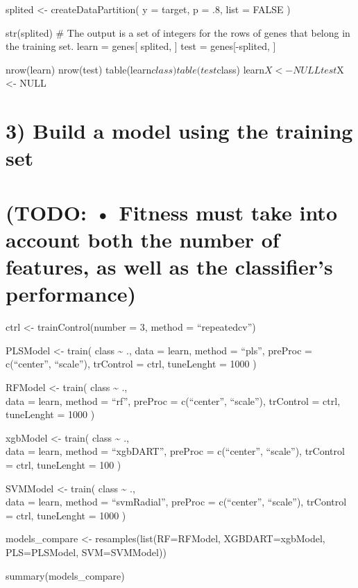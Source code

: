 \documentclass[]{article}
\begin{document}
splited \textless- createDataPartition( y = target, p = .8, list = FALSE
)

str(splited) \# The output is a set of integers for the rows of genes
that belong in the training set. learn = genes{[} splited, {]} test =
genes{[}-splited, {]}

nrow(learn) nrow(test) table(learn\(class) table(test\)class)
learn\(X <- NULL test\)X \textless- NULL

\hypertarget{build-a-model-using-the-training-set}{%
\section{3) Build a model using the training
set}\label{build-a-model-using-the-training-set}}

\hypertarget{todo-fitness-must-take-into-account-both-the-number-of-features-as-well-as-the-classifiers-performance}{%
\section{(TODO: • Fitness must take into account both the number of
features, as well as the classifier's
performance)}\label{todo-fitness-must-take-into-account-both-the-number-of-features-as-well-as-the-classifiers-performance}}

ctrl \textless- trainControl(number = 3, method = ``repeatedcv'')

PLSModel \textless- train( class \textasciitilde{} ., data = learn,
method = ``pls'', preProc = c(``center'', ``scale''), trControl = ctrl,
tuneLenght = 1000 )

RFModel \textless- train( class \textasciitilde{} .,\\
data = learn, method = ``rf'', preProc = c(``center'', ``scale''),
trControl = ctrl, tuneLenght = 1000 )

xgbModel \textless- train( class \textasciitilde{} .,\\
data = learn, method = ``xgbDART'', preProc = c(``center'', ``scale''),
trControl = ctrl, tuneLenght = 100 )

SVMModel \textless- train( class \textasciitilde{} .,\\
data = learn, method = ``svmRadial'', preProc = c(``center'',
``scale''), trControl = ctrl, tuneLenght = 1000 )

models\_compare \textless- resamples(list(RF=RFModel, XGBDART=xgbModel,
PLS=PLSModel, SVM=SVMModel))

summary(models\_compare)
\end{document}
